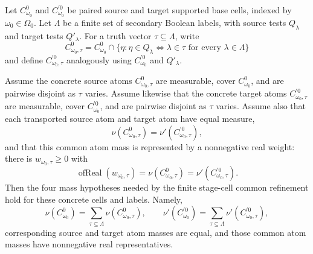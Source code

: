 \begin{helper}
Let \(C^0_{\omega_0}\) and \(C^{\prime0}_{\omega_0}\) be paired source and
target supported base cells, indexed by \(\omega_0\in\Omega_0\).  Let
\(\Lambda\) be a finite set of secondary Boolean labels, with source tests
\(Q_\lambda\) and target tests \(Q'_\lambda\).  For a truth vector
\(\tau\subseteq\Lambda\), write
\[
C^0_{\omega_0,\tau}
=C^0_{\omega_0}\cap
  \{\eta:\eta\in Q_\lambda\Longleftrightarrow \lambda\in\tau
      \text{ for every }\lambda\in\Lambda\}
\]
and define \(C^{\prime0}_{\omega_0,\tau}\) analogously using
\(C^{\prime0}_{\omega_0}\) and \(Q'_\lambda\).

Assume the concrete source atoms \(C^0_{\omega_0,\tau}\) are measurable,
cover \(C^0_{\omega_0}\), and are pairwise disjoint as \(\tau\) varies.
Assume likewise that the concrete target atoms
\(C^{\prime0}_{\omega_0,\tau}\) are measurable, cover
\(C^{\prime0}_{\omega_0}\), and are pairwise disjoint as \(\tau\) varies.
Assume also that each transported source atom and target atom have equal
measure,
\[
\nu(C^0_{\omega_0,\tau})=\nu'(C^{\prime0}_{\omega_0,\tau}),
\]
and that this common atom mass is represented by a nonnegative real weight:
there is \(w_{\omega_0,\tau}\ge0\) with
\[
\operatorname{ofReal}(w_{\omega_0,\tau})
=\nu(C^0_{\omega_0,\tau})
=\nu'(C^{\prime0}_{\omega_0,\tau}).
\]
Then the four mass hypotheses needed by the finite stage-cell common
refinement hold for these concrete cells and labels.  Namely,
\[
\nu(C^0_{\omega_0})
=\sum_{\tau\subseteq\Lambda}\nu(C^0_{\omega_0,\tau}),
\qquad
\nu'(C^{\prime0}_{\omega_0})
=\sum_{\tau\subseteq\Lambda}\nu'(C^{\prime0}_{\omega_0,\tau}),
\]
corresponding source and target atom masses are equal, and those common atom
masses have nonnegative real representatives.
\end{helper}
